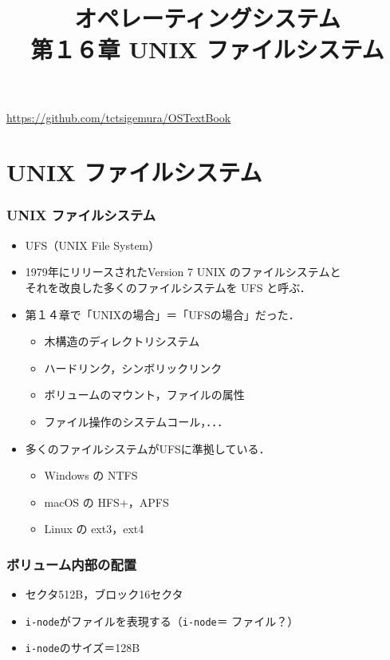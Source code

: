 \documentclass[handout]{beamer}                   %
\newcommand{\inode}{\texttt{i-node}}
\begin{document}
\title[UNIX ファイルシステム]
      {オペレーティングシステム\\第１６章 UNIX ファイルシステム}
\date{}
\begin{frame}
  \titlepage
  \centerline{\url{https://github.com/tctsigemura/OSTextBook}}
\end{frame}


\section{UNIX ファイルシステム}
\begin{frame}
  \frametitle{UNIX ファイルシステム}
  \begin{itemize}
  \item UFS（UNIX File System）
  \item 1979年にリリースされたVersion 7 UNIX のファイルシステムと \\
    それを改良した多くのファイルシステムを UFS と呼ぶ．
  \item 第１４章で「UNIXの場合」＝「UFSの場合」だった．
    \begin{itemize}
    \item 木構造のディレクトリシステム
    \item ハードリンク，シンボリックリンク
    \item ボリュームのマウント，ファイルの属性
    \item ファイル操作のシステムコール，．．．
    \end{itemize}
  \item 多くのファイルシステムがUFSに準拠している．
    \begin{itemize}
    \item Windows の NTFS
    \item macOS の HFS+，APFS
    \item Linux の ext3，ext4
    \end{itemize}
  \end{itemize}
  \vfill
\end{frame}

\begin{frame}
  \frametitle{ボリューム内部の配置}
  \begin{itemize}
  \item セクタ512B，ブロック16セクタ
  \item \inode がファイルを表現する（\inode ＝ ファイル？）
  \item \inode のサイズ＝128B
  \end{itemize}
  \vfill
\end{frame}
\end{document}
